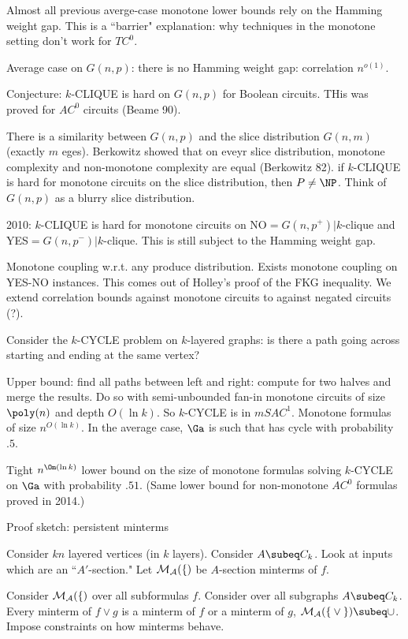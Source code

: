 Almost all previous averge-case monotone lower bounds rely on the Hamming weight gap. This is a ``barrier" explanation: why techniques in the monotone setting don't work for $TC^0$.

Average case on $G(n,p)$: there is no Hamming weight gap: 
correlation $n^{o(1)}$. 

Conjecture: $k$-CLIQUE is hard on $G(n,p)$ for Boolean circuits. THis was proved for $AC^0$ circuits (Beame 90).

There is a similarity between $G(n,p)$ and the slice distribution $G(n,m)$ (exactly $m$ eges). Berkowitz showed that on eveyr slice distribution, monotone complexity and non-monotone complexity are equal (Berkowitz 82). if $k$-CLIQUE is hard for monotone circuits on the slice distribution, then $P\ne \NP$. Think of $G(n,p)$ as a blurry slice distribution. 

2010: $k$-CLIQUE is hard for monotone circuits on NO$=G(n,p^+)|k$-clique and YES$=G(n,p^-)|k$-clique. This is still subject to the Hamming weight gap.

Monotone coupling w.r.t. any produce distribution. Exists monotone coupling on YES-NO instances. This comes out of Holley's proof of the FKG inequality. We extend correlation bounds against monotone circuits to against negated circuits (?).

Consider the $k$-CYCLE problem on $k$-layered graphs: is there a path going across starting and ending at the same vertex?

Upper bound: find all paths between left and right: compute for two halves and merge the results. Do so with semi-unbounded fan-in monotone circuits of size $\poly(n)$ and depth $O(\ln k)$. So $k$-CYCLE is in $mSAC^1$. Monotone formulas of size $n^{O(\ln k)}$. In the average case, $\Ga$ is such that has cycle with probability $.5$.

Tight $n^{\Om(\ln k)}$ lower bound on the size of monotone formulas solving $k$-CYCLE on $\Ga$ with probability $.51$.
(Same lower bound for non-monotone $AC^0$ formulas proved in 2014.)

%
Proof sketch: persistent minterms

Consider $kn$ layered vertices (in $k$ layers). Consider $A\subeq C_k$. Look at inputs which are an ``$A'$-section." %
Let $\cal M_A(f)$ be $A$-section minterms of $f$.

Consider $\cal M_A(f)$ over all subformulas $f$. Consider over all subgraphs $A\subeq C_k$. Every minterm of $f\vee g$ is a minterm of $f$ or a minterm of $g$, $\cal M_{A}(f\vee g)\subeq \cup$.
Impose constraints on how minterms behave.

